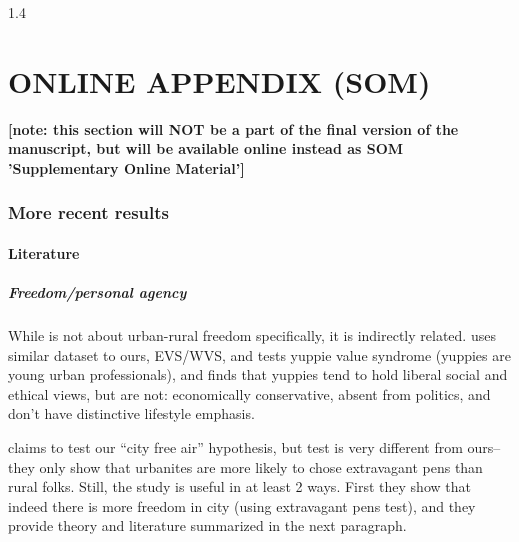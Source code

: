 \documentclass[10pt, letterpaper]{article}
\begin{document}
\begin{spacing}{1.4}



\setcounter{section}{0}
 \part*{\Huge ONLINE APPENDIX (SOM)}
 \textbf{[note: this section will NOT be a part of the final version of
   the manuscript, but will be available online instead as SOM 'Supplementary Online
   Material']} %

\tableofcontents
{} 





\section{More recent results}

\subsection{Literature}

\subsubsection{Freedom/personal agency}
{While \citet{ester93} is not about urban-rural freedom specifically,  it is
 indirectly related.  
 \citet{ester93} uses similar dataset to ours, EVS/WVS, and tests yuppie value syndrome (yuppies are young urban
 professionals), and finds that yuppies tend to hold liberal social and ethical
 views, but are not: %
 economically conservative, absent from
 politics, and don't have distinctive lifestyle emphasis. 
}

\citet{yamagishi12} claims to test
 our ``city free air'' hypothesis, %
 but \citet{yamagishi12} test is very different
 from ours--they only show that urbanites are more likely to chose extravagant pens
 than rural folks. Still, the study is useful in at least 2 ways. First they
 show that indeed there is more freedom in city (using extravagant pens test),
 and they provide theory and literature summarized in the next paragraph.   
 


\end{spacing}
\end{document}
